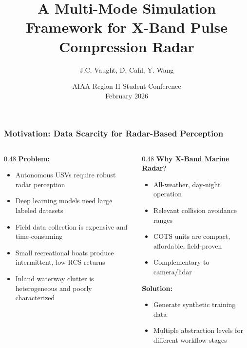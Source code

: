\documentclass[aspectratio=169, 10pt]{beamer}
\title{A Multi-Mode Simulation Framework for X-Band Pulse Compression Radar}
\author{J.C. Vaught, D. Cahl, Y. Wang}
\institute{Department of Mechanical Engineering\\University of South Carolina}
\date{AIAA Region II Student Conference\\February 2026}
\begin{document}
\begin{frame}[plain]
  \titlepage
\end{frame}

\begin{frame}
  \frametitle{Motivation: Data Scarcity for Radar-Based Perception}

  \begin{columns}[T]
    \begin{column}{0.48\textwidth}
      \textbf{Problem:}
      \begin{itemize}
        \item Autonomous USVs require robust radar perception
        \item Deep learning models need large labeled datasets
        \item Field data collection is expensive and time-consuming
        \item Small recreational boats produce intermittent, low-RCS returns
        \item Inland waterway clutter is heterogeneous and poorly characterized
      \end{itemize}
    \end{column}

    \begin{column}{0.48\textwidth}
      \textbf{Why X-Band Marine Radar?}
      \begin{itemize}
        \item All-weather, day-night operation
        \item Relevant collision avoidance ranges
        \item COTS units are compact, affordable, field-proven
        \item Complementary to camera/lidar
      \end{itemize}

      \vspace{0.5cm}
      \textbf{Solution:}
      \begin{itemize}
        \item Generate synthetic training data
        \item Multiple abstraction levels for different workflow stages
      \end{itemize}
    \end{column}
  \end{columns}
\end{frame}
\end{document}

